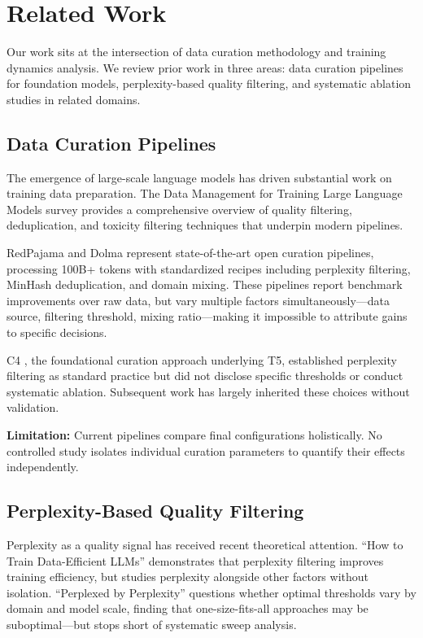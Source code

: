\section{Related Work}
\label{sec:related}

Our work sits at the intersection of data curation methodology and training dynamics analysis. We review prior work in three areas: data curation pipelines for foundation models, perplexity-based quality filtering, and systematic ablation studies in related domains.

\subsection{Data Curation Pipelines}

The emergence of large-scale language models has driven substantial work on training data preparation. The Data Management for Training Large Language Models survey \citep{zha2023data} provides a comprehensive overview of quality filtering, deduplication, and toxicity filtering techniques that underpin modern pipelines.

RedPajama \citep{together2023redpajama} and Dolma \citep{soldaini2024dolma} represent state-of-the-art open curation pipelines, processing 100B+ tokens with standardized recipes including perplexity filtering, MinHash deduplication, and domain mixing. These pipelines report benchmark improvements over raw data, but vary multiple factors simultaneously---data source, filtering threshold, mixing ratio---making it impossible to attribute gains to specific decisions.

C4 \citep{raffel2020t5}, the foundational curation approach underlying T5, established perplexity filtering as standard practice but did not disclose specific thresholds or conduct systematic ablation. Subsequent work has largely inherited these choices without validation.

\textbf{Limitation:} Current pipelines compare final configurations holistically. No controlled study isolates individual curation parameters to quantify their effects independently.

\subsection{Perplexity-Based Quality Filtering}

Perplexity as a quality signal has received recent theoretical attention. ``How to Train Data-Efficient LLMs'' \citep{tirumala2024dataefficient} demonstrates that perplexity filtering improves training efficiency, but studies perplexity alongside other factors without isolation. ``Perplexed by Perplexity'' \citep{abbas2024perplexed} questions whether optimal thresholds vary by domain and model scale, finding that one-size-fits-all approaches may be suboptimal---but stops short of systematic sweep analysis.

